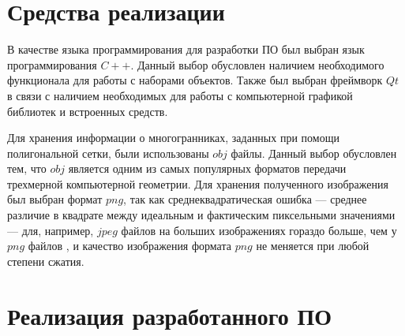 \section{Средства реализации}

В качестве языка программирования для разработки ПО был выбран
язык программирования $C++$\cite{cpp}. Данный выбор обусловлен наличием
необходимого функционала для работы с наборами объектов. Также был
выбран фреймворк $Qt$\cite{qt} в связи с наличием необходимых для работы с
компьютерной графикой библиотек и встроенных средств.

Для хранения информации о многогранниках, заданных при помощи полигональной сетки, были использованы $obj$ файлы. Данный выбор
обусловлен тем, что $obj$ является одним из самых популярных форматов
передачи трехмерной компьютерной геометрии\cite{obj}. Для хранения полученного изображения был выбран формат $png$, так как среднеквадратическая
ошибка — среднее различие в квадрате между идеальным и фактическим
пиксельными значениями — для, например, $jpeg$ файлов на больших изображениях гораздо больше, чем у $png$ файлов \cite{png}, и качество изображения
формата $png$ не меняется при любой степени сжатия.

\section{Реализация разработанного ПО}

